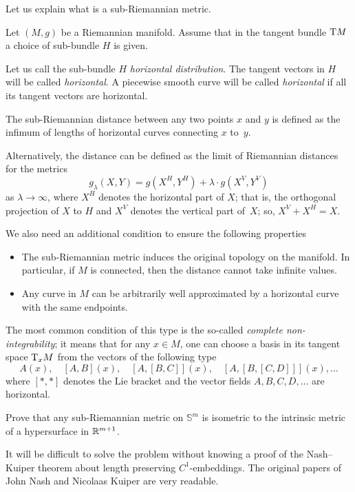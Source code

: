 Let us explain what is a sub-Riemannian metric.

Let $(M,g)$ be a Riemannian manifold.
Assume that in the tangent bundle $\mathrm{T} M$ 
a choice of sub-bundle $H$ is given.

Let us call the sub-bundle $H$  \emph{horizontal distribution}.
The tangent vectors in $H$ will be called {}\emph{horizontal}.
A piecewise smooth curve will be called {}\emph{horizontal}
if all its tangent vectors are horizontal.

The sub-Riemannian distance between any two points $x$ and $y$ is defined as the infimum of lengths of horizontal curves connecting $x$ to~$y$.

Alternatively, the distance can be defined as the limit of Riemannian distances 
for the metrics 
\[g_\lambda(X,Y)=g(X^H,Y^H)+\lambda\cdot g(X^V,Y^V)\] 
as $\lambda\to \infty$,
where $X^H$ denotes the horizontal part of $X$;
that is, the orthogonal projection of $X$ to $H$
and $X^V$ denotes the vertical part of~$X$;
so, $X^V+X^H=X$.

We also need an additional condition to ensure the following properties 
\begin{itemize}
\item The sub-Riemannian metric induces the original topology on the manifold. 
In particular, if $M$ is connected, then the distance cannot take infinite values.
\item Any curve in $M$ can be arbitrarily well approximated by a horizontal curve with the same endpoints.
\end{itemize}
The most common condition of this type is the so-called {}\emph{complete non-integrability};
it means that for any $x\in M$, 
one can choose a basis in its tangent space $\mathrm{T}_xM$
from the vectors of the following type
\[A(x),\quad  [A,B](x),\quad [A,[B,C]](x),\quad [A,[B,[C,D]]](x),\dots\] 
where $[{*},{*}]$ denotes the Lie bracket 
and the vector fields $A,B,C,D, \dots$ are horizontal.

\begin{pr}
Prove that any sub-Riemannian metric 
on $\mathbb{S}^m$ is isometric to the intrinsic metric of a hypersurface in $\mathbb{R}^{m+1}$.
\end{pr}


It will be difficult to solve the problem without knowing a proof of the Nash--Kuiper theorem about length preserving $C^1$-embeddings.
The original papers of John Nash 
and Nicolaas Kuiper \cite{nash,kuiper} are very readable.

